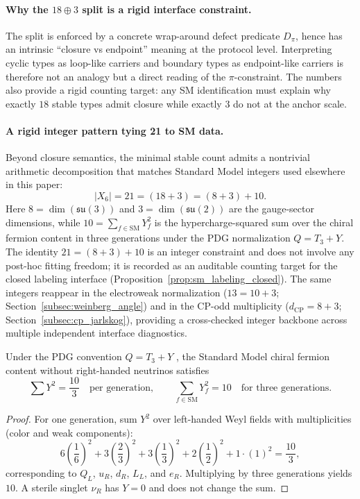 \paragraph{Why the \texorpdfstring{$18\oplus 3$}{18+3} split is a rigid interface constraint.}
The split is enforced by a concrete wrap-around defect predicate $D_\pi$, hence has an intrinsic ``closure vs endpoint'' meaning at the protocol level.
Interpreting cyclic types as loop-like carriers and boundary types as endpoint-like carriers is therefore not an analogy but a direct reading of the $\pi$-constraint.
The numbers also provide a rigid counting target: any SM identification must explain why exactly $18$ stable types admit closure while exactly $3$ do not at the anchor scale.

\paragraph{A rigid integer pattern tying 21 to SM data.}
Beyond closure semantics, the minimal stable count admits a nontrivial arithmetic decomposition that matches Standard Model integers used elsewhere in this paper:
\[
|X_6|=21=(18+3)=(8+3)+10.
\]
Here $8=\dim(\mathfrak{su}(3))$ and $3=\dim(\mathfrak{su}(2))$ are the gauge-sector dimensions, while $10=\sum_{f\in\mathrm{SM}}Y_f^2$ is the hypercharge-squared sum over the chiral fermion content in three generations under the PDG normalization $Q=T_3+Y$.
The identity $21=(8+3)+10$ is an integer constraint and does not involve any post-hoc fitting freedom; it is recorded as an auditable counting target for the closed labeling interface (Proposition~\ref{prop:sm_labeling_closed}).
The same integers reappear in the electroweak normalization ($13=10+3$; Section~\ref{subsec:weinberg_angle}) and in the CP-odd multiplicity ($d_{\mathrm{CP}}=8+3$; Section~\ref{subsec:cp_jarlskog}), providing a cross-checked integer backbone across multiple independent interface diagnostics.

\begin{lemma}\label{lem:hypercharge_sum_10}
Under the PDG convention $Q=T_3+Y$ \cite{PDGRPP2024}, the Standard Model chiral fermion content without right-handed neutrinos satisfies
\[
\sum Y^2=\frac{10}{3}\quad\text{per generation},
\qquad
\sum_{f\in\mathrm{SM}}Y_f^2=10\quad\text{for three generations}.
\]
\end{lemma}
\begin{proof}
For one generation, sum $Y^2$ over left-handed Weyl fields with multiplicities (color and weak components):
\[
6\left(\frac{1}{6}\right)^2
 +3\left(\frac{2}{3}\right)^2
 +3\left(\frac{1}{3}\right)^2
 +2\left(\frac{1}{2}\right)^2
 +1\cdot (1)^2
=\frac{10}{3},
\]
corresponding to $Q_L$, $u_R$, $d_R$, $L_L$, and $e_R$.
Multiplying by three generations yields $10$.
A sterile singlet $\nu_R$ has $Y=0$ and does not change the sum.
\end{proof}

